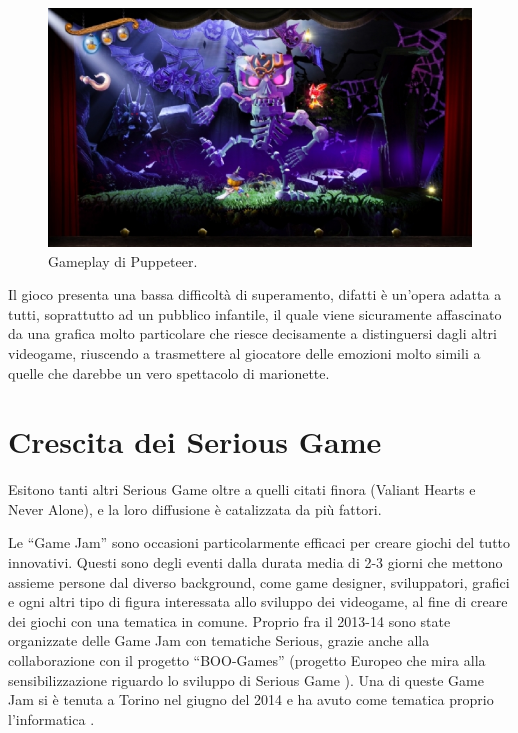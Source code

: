 \begin{figure}[h]
\centerline{\includegraphics[scale=0.6]{images/statoarte/pgameplay.jpg}}
\caption{Gameplay di Puppeteer.}
\label{fig:pgameplay}
\end{figure}

Il gioco presenta una bassa difficoltà di superamento, difatti è un'opera adatta a tutti, soprattutto ad un pubblico infantile, il quale viene sicuramente affascinato da una grafica molto particolare che riesce decisamente a distinguersi dagli altri videogame, riuscendo a trasmettere al giocatore delle emozioni molto simili a quelle che darebbe un vero spettacolo di marionette.



\section{Crescita dei Serious Game}

Esitono tanti altri Serious Game oltre a quelli citati finora (Valiant Hearts e Never Alone), e la loro diffusione è catalizzata da più fattori. 

Le ``Game Jam'' \cite{gamejamwiki} sono occasioni particolarmente efficaci per creare giochi del tutto innovativi. Questi sono degli eventi dalla durata media di 2-3 giorni che mettono assieme  persone dal diverso background, come game designer, sviluppatori, grafici e ogni altri tipo di figura interessata allo sviluppo dei videogame, al fine di creare dei giochi con una tematica in comune. Proprio fra il 2013-14 sono state organizzate delle Game Jam con tematiche Serious, grazie anche alla collaborazione con il progetto ``BOO-Games'' (progetto Europeo che mira alla sensibilizzazione riguardo lo sviluppo di Serious Game \cite{boogamesproject}\cite{boogamesprojecthome}). Una di queste Game Jam si è tenuta a Torino nel giugno del 2014 e ha avuto come tematica proprio l'informatica \cite{jamtoday}.

